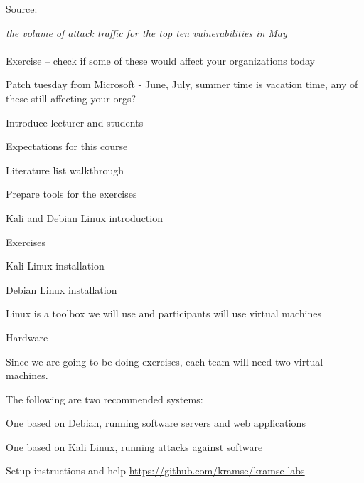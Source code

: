 \documentclass[Screen16to9,17pt]{foils}
\begin{document}
Source: 


\begin{list2}
\item \emph{the volume of attack traffic for the top ten vulnerabilities in May}\\
\\
Exercise -- check if some of these would affect your organizations today
\item Patch tuesday from Microsoft - June, July, summer time is vacation time, any of these still affecting your orgs?
\end{list2}





\begin{list2}
\item Introduce lecturer and students
\item Expectations for this course
\item Literature list walkthrough
\item Prepare tools for the exercises
\item Kali and Debian Linux introduction
\end{list2}

Exercises
\begin{list2}
\item Kali Linux installation
\item Debian Linux installation
\end{list2}
Linux is a toolbox we will use and participants will use virtual machines



Hardware

Since we are going to be doing exercises, each team will need two virtual machines.

The following are two recommended systems:
\begin{list2}
\item One based on Debian, running software servers and web applications
\item One based on Kali Linux, running attacks against software
\item Setup instructions and help \url{https://github.com/kramse/kramse-labs}
\end{list2}
\end{document}

